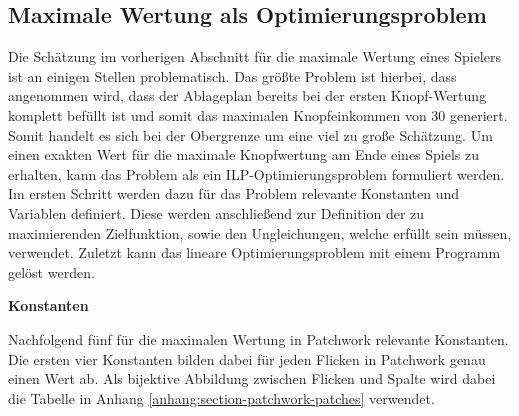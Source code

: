 \subsection*{Maximale Wertung als Optimierungsproblem}

Die Schätzung im vorherigen Abschnitt für die maximale Wertung eines Spielers ist an einigen Stellen problematisch. Das größte Problem ist hierbei, dass angenommen wird, dass der Ablageplan bereits bei der ersten Knopf-Wertung komplett befüllt ist und somit das maximalen Knopfeinkommen von $30$ generiert. Somit handelt es sich bei der Obergrenze um eine viel zu große Schätzung. Um einen exakten Wert für die maximale Knopfwertung am Ende eines Spiels zu erhalten, kann das Problem als ein \ac{ILP}-Optimierungsproblem formuliert werden. Im ersten Schritt werden dazu für das Problem relevante Konstanten und Variablen definiert. Diese werden anschließend zur Definition der zu maximierenden Zielfunktion, sowie den Ungleichungen, welche erfüllt sein müssen, verwendet. Zuletzt kann das lineare Optimierungsproblem mit einem Programm gelöst werden.

\textbf{Konstanten}

Nachfolgend fünf für die maximalen Wertung in Patchwork relevante Konstanten. Die ersten vier Konstanten bilden dabei für jeden Flicken in Patchwork genau einen Wert ab. Als bijektive Abbildung zwischen Flicken und Spalte wird dabei die Tabelle in Anhang \ref{anhang:section-patchwork-patches} verwendet.

\renewcommand{\arraystretch}{0.6666}

